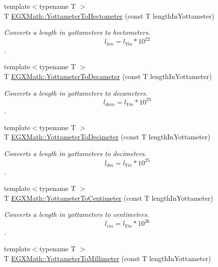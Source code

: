 \begin{DoxyCompactItemize}
{\footnotesize template$<$typename T $>$ }\\T \mbox{\hyperlink{group___e_g_x_math-_conversions-_length_conversions-_s_i-_yottameter-_s_i_ga3c7aed6e299bc4f0288d0672a7262320}{E\+G\+X\+Math\+::\+Yottameter\+To\+Hectometer}} (const T length\+In\+Yottameter)
\begin{DoxyCompactList}\small\item\em Converts a length in yottameters to hectometers. \[ l_{hm}=l_{Ym} * 10^{22} \]. \end{DoxyCompactList}\item 
{\footnotesize template$<$typename T $>$ }\\T \mbox{\hyperlink{group___e_g_x_math-_conversions-_length_conversions-_s_i-_yottameter-_s_i_gadb4ab7fb7c1091124160d66ace6439a3}{E\+G\+X\+Math\+::\+Yottameter\+To\+Decameter}} (const T length\+In\+Yottameter)
\begin{DoxyCompactList}\small\item\em Converts a length in yottameters to decameters. \[ l_{dam}=l_{Ym} * 10^{23} \]. \end{DoxyCompactList}\item 
{\footnotesize template$<$typename T $>$ }\\T \mbox{\hyperlink{group___e_g_x_math-_conversions-_length_conversions-_s_i-_yottameter-_s_i_ga8d80b66500f1ccc85839ec50b0ca8b0d}{E\+G\+X\+Math\+::\+Yottameter\+To\+Decimeter}} (const T length\+In\+Yottameter)
\begin{DoxyCompactList}\small\item\em Converts a length in yottameters to decimeters. \[ l_{dm}=l_{Ym} * 10^{25} \]. \end{DoxyCompactList}\item 
{\footnotesize template$<$typename T $>$ }\\T \mbox{\hyperlink{group___e_g_x_math-_conversions-_length_conversions-_s_i-_yottameter-_s_i_ga29b512ac5c39f960b5f705cfb9bfe226}{E\+G\+X\+Math\+::\+Yottameter\+To\+Centimeter}} (const T length\+In\+Yottameter)
\begin{DoxyCompactList}\small\item\em Converts a length in yottameters to centimeters. \[ l_{cm}=l_{Ym} * 10^{26} \]. \end{DoxyCompactList}\item 
{\footnotesize template$<$typename T $>$ }\\T \mbox{\hyperlink{group___e_g_x_math-_conversions-_length_conversions-_s_i-_yottameter-_s_i_ga0e68b787003f09883a6b15b92b003a07}{E\+G\+X\+Math\+::\+Yottameter\+To\+Millimeter}} (const T length\+In\+Yottameter)

\end{DoxyCompactItemize}
